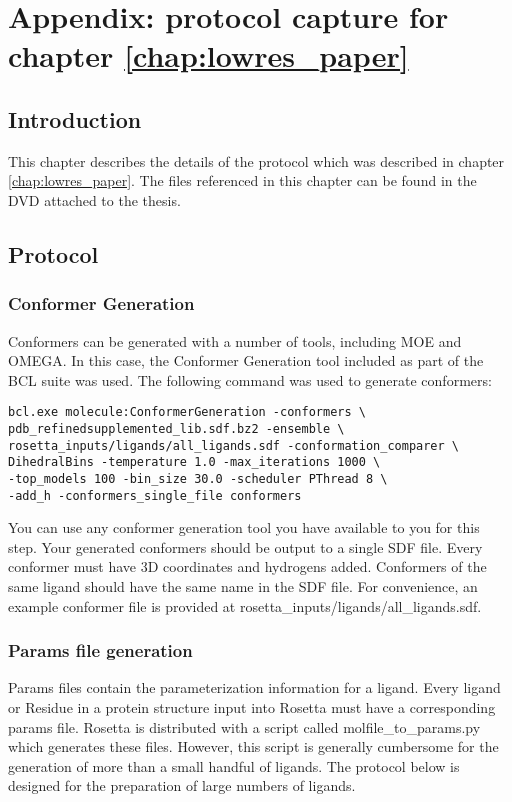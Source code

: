 \chapter{Appendix: protocol capture for chapter \ref{chap:lowres_paper}}

\section{Introduction}

This chapter describes the details of the protocol which was described in chapter \ref{chap:lowres_paper}.
The files referenced in this chapter can be found in the DVD attached to the thesis.

\section{Protocol}

\subsection{Conformer Generation}

Conformers can be generated with a number of tools, including MOE and OMEGA.
In this case, the Conformer Generation tool included as part of the \ac{BCL} suite was used.
The following command was used to generate conformers:
\singlespace
\begin{verbatim}
bcl.exe molecule:ConformerGeneration -conformers \
pdb_refinedsupplemented_lib.sdf.bz2 -ensemble \
rosetta_inputs/ligands/all_ligands.sdf -conformation_comparer \
DihedralBins -temperature 1.0 -max_iterations 1000 \
-top_models 100 -bin_size 30.0 -scheduler PThread 8 \
-add_h -conformers_single_file conformers
\end{verbatim}
\doublespace
You can use any conformer generation tool you have available to you for this step.
Your generated conformers should be output to a single \ac{SDF} file.
Every conformer must have 3D coordinates and hydrogens added.
Conformers of the same ligand should have the same name in the \ac{SDF} file.
For convenience, an example conformer file is provided at rosetta\_inputs/ligands/all\_ligands.sdf.

\subsection{Params file generation}

Params files contain the parameterization information for a ligand.
Every  ligand or Residue in a protein structure input into Rosetta must have a corresponding params file.
Rosetta is distributed with a script called molfile\_to\_params.py which generates these files.
However, this script is generally cumbersome for the generation of more than a small handful of ligands.
The protocol below is designed for the preparation of large numbers of ligands.

